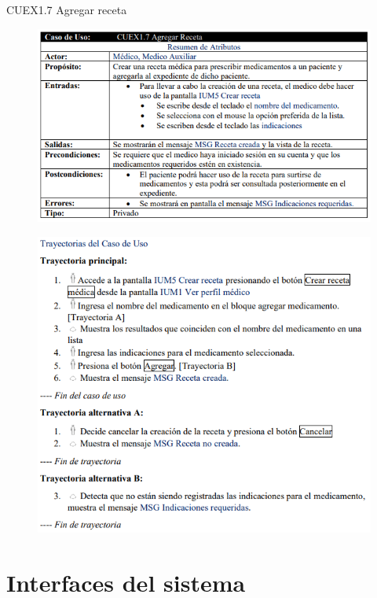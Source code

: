 \documentclass[12pt,letterpaper]{article}
\begin{document}
            \newpage
            CUEX1.7 Agregar receta
            \begin{figure}[H]
                \centering
                \includegraphics [scale=0.8]{specs/specAgregarReceta}
            \end{figure}
            \begin{figure}[H]
                \centering
                \includegraphics [scale=0.7]{specs/trayAgregarReceta}
            \end{figure}


    \newpage
    \section{Interfaces del sistema}
\end{document}
